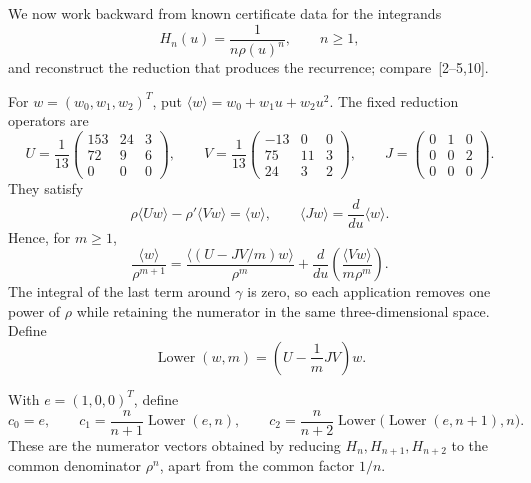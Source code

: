 \documentclass[11pt,fleqn]{article}
\theoremstyle{plain}
\newcommand{\poly}[1]{\langle #1\rangle}
\begin{document}
	We now work backward from known certificate data for the integrands
	\[
	H_n(u)=\frac{1}{n\rho(u)^n},
	\qquad n\geq1,
	\]
	and reconstruct the reduction that produces the recurrence; compare~[2--5,10].
	
	For $w=(w_0,w_1,w_2)^T$, put
	$\poly{w}=w_0+w_1u+w_2u^2$. The fixed reduction operators are
	\[
	U=\frac1{13}
	\begin{pmatrix}
		153&24&3\\72&9&6\\0&0&0
	\end{pmatrix},\qquad
	V=\frac1{13}
	\begin{pmatrix}
		-13&0&0\\75&11&3\\24&3&2
	\end{pmatrix},\qquad
	J=\begin{pmatrix}0&1&0\\0&0&2\\0&0&0\end{pmatrix}.
	\]
	They satisfy
	\[
	\rho\poly{Uw}-\rho'\poly{Vw}=\poly{w},
	\qquad
	\poly{Jw}=\frac{d}{du}\poly{w}.
	\]
	Hence, for $m\geq1$,
	\[
	\frac{\poly{w}}{\rho^{m+1}}
	=
	\frac{\poly{(U-JV/m)w}}{\rho^m}
	+\frac{d}{du}\left(\frac{\poly{Vw}}{m\rho^m}\right).
	\]
	The integral of the last term around $\gamma$ is zero, so each
	application removes one power of $\rho$ while retaining the numerator
	in the same three-dimensional space. Define
	\[
	\operatorname{Lower}(w,m)
	=
	\left(U-\frac1mJV\right)w.
	\]
	
	With $e=(1,0,0)^T$, define
	\[
	c_0=e,\qquad
	c_1=\frac{n}{n+1}\operatorname{Lower}(e,n),\qquad
	c_2=\frac{n}{n+2}\operatorname{Lower}
	\bigl(\operatorname{Lower}(e,n+1),n\bigr).
	\]
	These are the numerator vectors obtained by reducing
	$H_n,H_{n+1},H_{n+2}$ to the common denominator $\rho^n$, apart from
	the common factor $1/n$.
	
\end{document}
